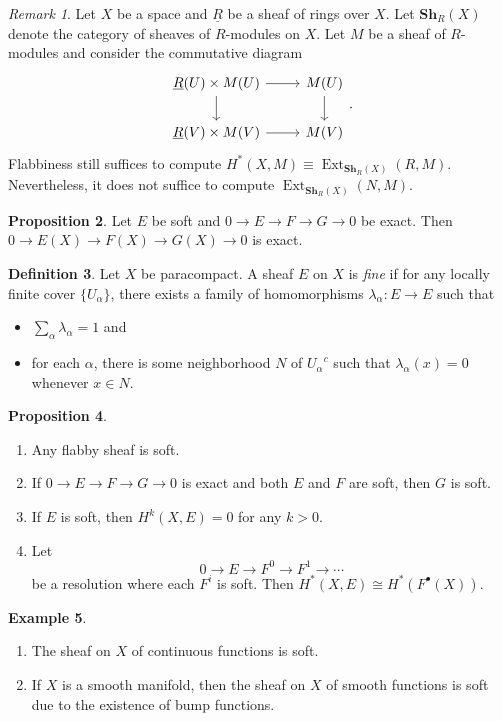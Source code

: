 \documentclass[10pt,letterpaper,cm]{nupset}
\theoremstyle{definition}
\newtheorem{definition}{Definition}[subsection]
\newtheorem{exmp}[definition]{Example}
\theoremstyle{theorem}
\newtheorem{prop}[definition]{Proposition}
\theoremstyle{remark}
\newtheorem{remark}[definition]{Remark}
\newcommand{\1}{\mathbb{1}}
\newcommand{\0}{\vec 0}
\DeclareMathOperator{\ext}{Ext}
\begin{document}
\begin{remark}
Let $X$ be a space and $\underline{R}$ be a sheaf of rings over $X$. Let $\mathbf{Sh}_R(X)$ denote the category of sheaves of $R$-modules on $X$. Let $M$ be a sheaf of $R$-modules and consider the commutative diagram
\[
\begin{tikzcd}
\underline{R}(U) \times M(U) \arrow[r] \arrow[d] &  M(U) \arrow[d] \\
 \underline{R}(V) \times M(V) \arrow[r]          & M(V)           
\end{tikzcd}
.\]
Flabbiness still suffices to compute $H^{\ast}(X, M) \equiv \ext_{\mathbf{Sh}_R(X)}(R, M)$. Nevertheless, it does not suffice to compute $\ext_{\mathbf{Sh}_R(X)}(N, M)$.
\end{remark}

\begin{prop}
Let $E$ be soft and $0 \to E \to F \to G \to 0$ be exact. Then $0 \to E(X) \to F(X) \to G(X) \to 0$ is exact.
\end{prop}

\begin{definition}
Let $X$ be paracompact. A sheaf $E$ on $X$ is \textit{fine} if for any locally finite cover $\{U_{\alpha}\}$, there exists a family of homomorphisms $\lambda_{\alpha} : E \to E$ such that 
\begin{itemize}
\item $\sum_{\alpha} \lambda_{\alpha} =1$ and
\item for each $\alpha$, there is some neighborhood $N$ of ${U_{\alpha}}^c$ such that $\lambda_{\alpha}(x) =0$ whenever $x \in N$.
\end{itemize}
\end{definition}

\begin{prop} $ $
\begin{enumerate}
\item Any flabby sheaf is soft.
\item If $0 \to E \to F \to G \to 0$ is exact and both $E$ and $F$ are soft, then $G$ is soft.
\item If $E$ is soft, then $H^k(X, E) =0$ for any $k >0$.
\item Let $$0 \to E \to F^0 \to F^1 \to \cdots$$ be a resolution where each $F^i$ is soft. Then $H^{\ast}(X, E) \cong H^{\ast}(F^{\bullet}(X))$.
\end{enumerate}
\end{prop}

\begin{exmp} $ $
\begin{enumerate}
\item The sheaf on $X$ of continuous functions is soft.
\item If $X$ is a smooth manifold, then the sheaf on $X$ of smooth functions is soft due to the existence of bump functions.
\end{enumerate}
\end{exmp}
\end{document}
